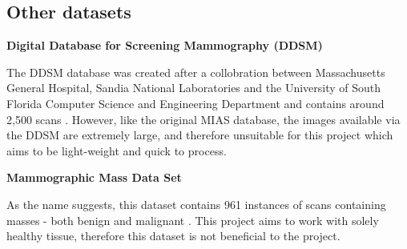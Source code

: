 \subsection{Other datasets}

\noindent \textbf{Digital Database for Screening Mammography (DDSM)}

The \acrshort{DDSM} database was created after a collobration between Massachusetts General Hospital, Sandia National Laboratories and the University of South Florida Computer Science and Engineering Department and contains around 2,500 scans \cite{Heath_Bowyer_Kopans_Moore_Kegelmeyer_Processing} \cite{Heath_Bowyer_Kopans_Kegelmeyer_Moore_Chang_MunishKumaran_1998}.
However, like the original \acrshort{MIAS} database, the images available via the DDSM are extremely large, and therefore unsuitable for this project which aims to be light-weight and quick to process.

\noindent \textbf{Mammographic Mass Data Set}

As the name suggests, this dataset contains 961 instances of scans containing masses - both benign and malignant \cite{Elter_Schulz-Wendtland_Wittenberg_2007}. This project aims to work with solely healthy tissue, therefore this dataset is not beneficial to the project.
